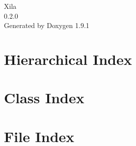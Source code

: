 \let\mypdfximage\pdfximage\def\pdfximage{\immediate\mypdfximage}\documentclass[twoside]{book}
\newcommand{\+}{\discretionary{\mbox{\scriptsize$\hookleftarrow$}}{}{}}
\newcommand{\clearemptydoublepage}{%
  \newpage{\pagestyle{empty}\cleardoublepage}%
}
\begin{document}
\raggedbottom

\hypersetup{pageanchor=false,
             bookmarksnumbered=true,
             pdfencoding=unicode
            }
\begin{titlepage}
\vspace*{7cm}
\begin{center}%
{\Large Xila \\[1ex]\large 0.\+2.\+0 }\\
\vspace*{1cm}
{\large Generated by Doxygen 1.9.1}\\
\end{center}
\end{titlepage}
\clearemptydoublepage
{}
\tableofcontents
\clearemptydoublepage
{}
\hypersetup{pageanchor=true}

\chapter{Hierarchical Index}

\chapter{Class Index}

\chapter{File Index}

\end{document}
